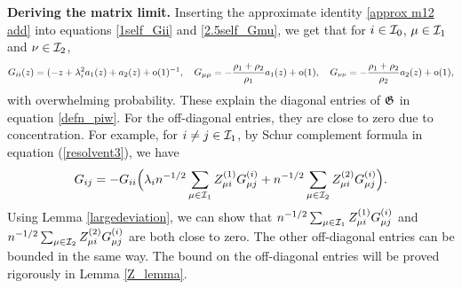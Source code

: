 \medskip
\noindent\textbf{Deriving the matrix limit.}  Inserting the approximate identity \eqref{approx m12 add} into equations \eqref{1self_Gii} and \eqref{2.5self_Gmu}, we get that for  $i \in \cal I_0$, $\mu \in \cal I_1$ and $\nu\in \cal I_2$,
$$G_{ii}(z)=(-z +\lambda_i^2 a_{1}(z) + a_2(z)+\oo(1)^{-1},\quad G_{\mu\mu}=-\frac{\rho_1+\rho_2}{\rho_1}a_{1}(z)+\oo(1),\quad G_{\nu\nu}=-\frac{\rho_1+\rho_2}{\rho_2}a_{2}(z)+\oo(1),$$
with overwhelming probability. These explain the diagonal entries of $\Gi$ in equation \eqref{defn_piw}. For the off-diagonal entries, they are close to zero due to concentration. For example, for $i\ne j\in \cal I_1$, by Schur complement formula in equation (\ref{resolvent3}), we have
$$G_{ij}=-G_{ii}\Big({\lambda_i}{n^{-1/2}}\sum_{\mu \in \cal I_1} Z^{(1)}_{\mu i} G^{(i)}_{\mu j} + {n^{-1/2}}\sum_{\mu \in \cal I_2} Z^{(2)}_{\mu i} G^{(i)}_{\mu j} \Big).$$
Using Lemma \ref{largedeviation}, we can show that $n^{-1/2}\sum_{\mu \in \cal I_1} Z^{(1)}_{\mu i} G^{(i)}_{\mu j}$ and $n^{-1/2}\sum_{\mu \in \cal I_2} Z^{(2)}_{\mu i} G^{(i)}_{\mu j}$ are both close to zero. The other off-diagonal entries can be bounded in the same way. The bound on the off-diagonal entries will be proved rigorously in Lemma \ref{Z_lemma}.


